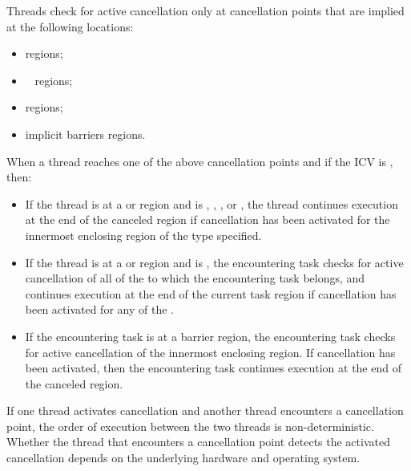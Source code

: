 Threads check for active cancellation only at cancellation points that are
implied at the following locations:

\begin{itemize}
\item {} regions;
\item {}~ regions;
\item {} regions;
\item implicit barriers regions.
\end{itemize}

When a thread reaches one of the above cancellation points and if the 
 ICV is ,  then: 

\begin{itemize}
\item If the thread is at a  or  region
      and  is , , , 
      or , the thread continues execution at the end of the canceled
      region if cancellation has been activated for the innermost enclosing region
      of the type specified.
\item If the thread is at a  or  region
      and  is , the encountering task
      checks for active cancellation of all of the  to which
      the encountering task belongs, and continues execution at the end of the
      current task region if cancellation has been activated for any of 
      the .
\item If the encountering task is at a barrier region, the encountering task
      checks for active cancellation of the innermost enclosing 
      region. If cancellation has been activated, then the encountering task
      continues execution at the end of the canceled region.
\end{itemize}

\begin{note}
If one thread activates cancellation and another thread encounters a cancellation
point, the order of execution between the two threads is non-deterministic.
Whether the thread that encounters a cancellation point detects the activated 
cancellation depends on the underlying hardware and operating system.
\end{note}

